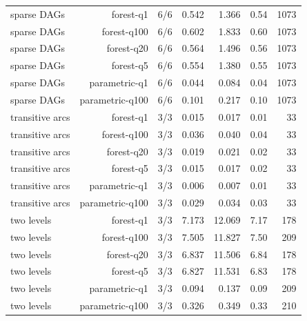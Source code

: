 {\begin{longtable}{lrrrrrr}
sparse DAGs & forest-q1 & 6/6 & 0.542 & 1.366 & 0.54 & 1073 \\
sparse DAGs & forest-q100 & 6/6 & 0.602 & 1.833 & 0.60 & 1073 \\
sparse DAGs & forest-q20 & 6/6 & 0.564 & 1.496 & 0.56 & 1073 \\
sparse DAGs & forest-q5 & 6/6 & 0.554 & 1.380 & 0.55 & 1073 \\
sparse DAGs & parametric-q1 & 6/6 & 0.044 & 0.084 & 0.04 & 1073 \\
sparse DAGs & parametric-q100 & 6/6 & 0.101 & 0.217 & 0.10 & 1073 \\
transitive arcs & forest-q1 & 3/3 & 0.015 & 0.017 & 0.01 & 33 \\
transitive arcs & forest-q100 & 3/3 & 0.036 & 0.040 & 0.04 & 33 \\
transitive arcs & forest-q20 & 3/3 & 0.019 & 0.021 & 0.02 & 33 \\
transitive arcs & forest-q5 & 3/3 & 0.015 & 0.017 & 0.02 & 33 \\
transitive arcs & parametric-q1 & 3/3 & 0.006 & 0.007 & 0.01 & 33 \\
transitive arcs & parametric-q100 & 3/3 & 0.029 & 0.034 & 0.03 & 33 \\
two levels & forest-q1 & 3/3 & 7.173 & 12.069 & 7.17 & 178 \\
two levels & forest-q100 & 3/3 & 7.505 & 11.827 & 7.50 & 209 \\
two levels & forest-q20 & 3/3 & 6.837 & 11.506 & 6.84 & 178 \\
two levels & forest-q5 & 3/3 & 6.827 & 11.531 & 6.83 & 178 \\
two levels & parametric-q1 & 3/3 & 0.094 & 0.137 & 0.09 & 209 \\
two levels & parametric-q100 & 3/3 & 0.326 & 0.349 & 0.33 & 210 \\
\end{longtable}
}
